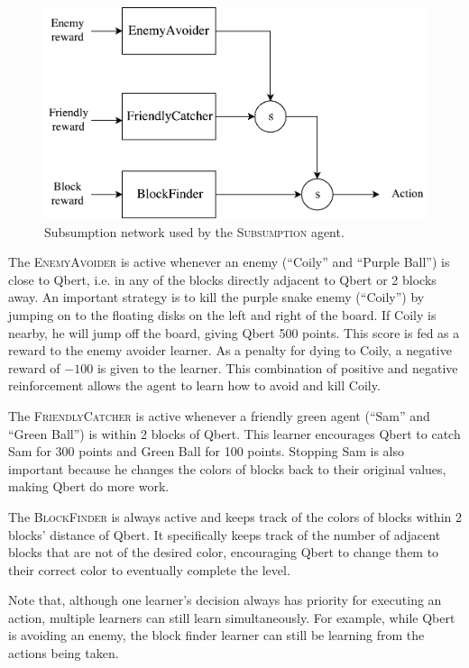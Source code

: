 \documentclass[a4paper,titlepage]{article}
\begin{document}
	\begin{figure}[!htb]
		\centering
		\includegraphics[width=\columnwidth]{plots/subsumption.pdf}
		\caption
		{Subsumption network used by the \textsc{Subsumption} agent.}
		\label{fig:subsumption}
	\end{figure}

	The \textsc{EnemyAvoider} is active whenever an enemy (``Coily'' and ``Purple Ball'') is close to Qbert, i.e. in any of the blocks directly adjacent to Qbert or 2 blocks away. An important strategy is to kill the purple snake enemy (``Coily'') by jumping on to the floating disks on the left and right of the board. If Coily is nearby, he will jump off the board, giving Qbert 500 points. This score is fed as a reward to the enemy avoider learner. As a penalty for dying to Coily, a negative reward of $-100$ is given to the learner. This combination of positive and negative reinforcement allows the agent to learn how to avoid and kill Coily.
	
	The \textsc{FriendlyCatcher} is active whenever a friendly green agent (``Sam'' and ``Green Ball'') is within 2 blocks of Qbert. This learner encourages Qbert to catch Sam for 300 points and Green Ball for 100 points. Stopping Sam is also important because he changes the colors of blocks back to their original values, making Qbert do more work.
	
	The \textsc{BlockFinder} is always active and keeps track of the colors of blocks within 2 blocks' distance of Qbert. It specifically keeps track of the number of adjacent blocks that are not of the desired color, encouraging Qbert to change them to their correct color to eventually complete the level.
	
	Note that, although one learner's decision always has priority for executing an action, multiple learners can still learn simultaneously. For example, while Qbert is avoiding an enemy, the block finder learner can still be learning from the actions being taken.
	
\end{document}
